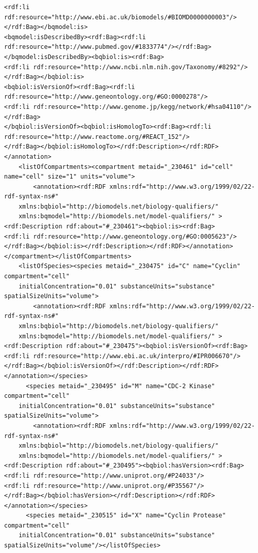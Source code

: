 \documentclass[a4paper,10pt,titlepage]{article}
\begin{document}
\begin{verbatim}
<rdf:li rdf:resource="http://www.ebi.ac.uk/biomodels/#BIOMD0000000003"/></rdf:Bag></bqmodel:is>
<bqmodel:isDescribedBy><rdf:Bag><rdf:li rdf:resource="http://www.pubmed.gov/#1833774"/></rdf:Bag>
</bqmodel:isDescribedBy><bqbiol:is><rdf:Bag>
<rdf:li rdf:resource="http://www.ncbi.nlm.nih.gov/Taxonomy/#8292"/></rdf:Bag></bqbiol:is>
<bqbiol:isVersionOf><rdf:Bag><rdf:li rdf:resource="http://www.geneontology.org/#GO:0000278"/>
<rdf:li rdf:resource="http://www.genome.jp/kegg/network/#hsa04110"/></rdf:Bag>
</bqbiol:isVersionOf><bqbiol:isHomologTo><rdf:Bag><rdf:li rdf:resource="http://www.reactome.org/#REACT_152"/>
</rdf:Bag></bqbiol:isHomologTo></rdf:Description></rdf:RDF></annotation>
    <listOfCompartments><compartment metaid="_230461" id="cell" name="cell" size="1" units="volume">
        <annotation><rdf:RDF xmlns:rdf="http://www.w3.org/1999/02/22-rdf-syntax-ns#" 
	xmlns:bqbiol="http://biomodels.net/biology-qualifiers/" 
	xmlns:bqmodel="http://biomodels.net/model-qualifiers/" >
<rdf:Description rdf:about="#_230461"><bqbiol:is><rdf:Bag>
<rdf:li rdf:resource="http://www.geneontology.org/#GO:0005623"/>
</rdf:Bag></bqbiol:is></rdf:Description></rdf:RDF></annotation></compartment></listOfCompartments>
    <listOfSpecies><species metaid="_230475" id="C" name="Cyclin" compartment="cell" 
	initialConcentration="0.01" substanceUnits="substance" spatialSizeUnits="volume">
        <annotation><rdf:RDF xmlns:rdf="http://www.w3.org/1999/02/22-rdf-syntax-ns#" 
	xmlns:bqbiol="http://biomodels.net/biology-qualifiers/" 
	xmlns:bqmodel="http://biomodels.net/model-qualifiers/" >
<rdf:Description rdf:about="#_230475"><bqbiol:isVersionOf><rdf:Bag>
<rdf:li rdf:resource="http://www.ebi.ac.uk/interpro/#IPR006670"/>
</rdf:Bag></bqbiol:isVersionOf></rdf:Description></rdf:RDF></annotation></species>
      <species metaid="_230495" id="M" name="CDC-2 Kinase" compartment="cell" 
	initialConcentration="0.01" substanceUnits="substance" spatialSizeUnits="volume">
        <annotation><rdf:RDF xmlns:rdf="http://www.w3.org/1999/02/22-rdf-syntax-ns#" 
	xmlns:bqbiol="http://biomodels.net/biology-qualifiers/" 
	xmlns:bqmodel="http://biomodels.net/model-qualifiers/" >
<rdf:Description rdf:about="#_230495"><bqbiol:hasVersion><rdf:Bag>
<rdf:li rdf:resource="http://www.uniprot.org/#P24033"/>
<rdf:li rdf:resource="http://www.uniprot.org/#P35567"/>
</rdf:Bag></bqbiol:hasVersion></rdf:Description></rdf:RDF></annotation></species>
      <species metaid="_230515" id="X" name="Cyclin Protease" compartment="cell" 
	initialConcentration="0.01" substanceUnits="substance" spatialSizeUnits="volume"/></listOfSpecies>

\end{verbatim}
\end{document}
